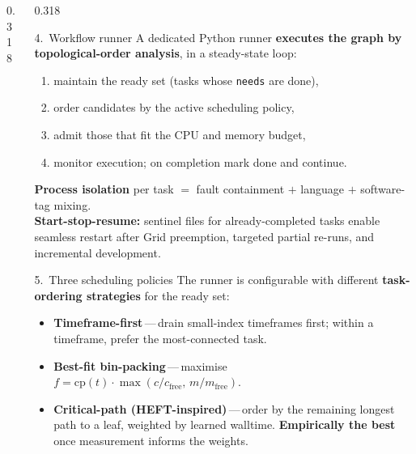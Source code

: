 \documentclass[final,t]{beamer}
\begin{document}
\begin{frame}[t,fragile]
\begin{columns}[t,onlytextwidth]
\begin{column}{0.318\textwidth}
\end{column}

\begin{column}{0.318\textwidth}

\begin{infoblock}{4.~Workflow runner}
A dedicated Python runner \textbf{executes the graph by
topological-order analysis}, in a steady-state loop:
\begin{enumerate}\setlength\itemsep{1mm}
  \item maintain the ready set (tasks whose \texttt{needs} are done),
  \item order candidates by the active scheduling policy,
  \item admit those that fit the CPU and memory budget,
  \item monitor execution; on completion mark done and continue.
\end{enumerate}
\vspace{2mm}
\textbf{Process isolation} per task $=$ fault containment $+$ language
$+$ software-tag mixing.\\[1mm]
\textbf{Start-stop-resume:} sentinel files for already-completed tasks
enable seamless restart after Grid preemption, targeted partial
re-runs, and incremental development.
\end{infoblock}

\vspace{8mm}

\begin{infoblock}{5.~Three scheduling policies}
The runner is configurable with different \textbf{task-ordering
strategies} for the ready set:
\begin{itemize}\setlength\itemsep{2mm}
  \item \textbf{Timeframe-first}\,---\,drain small-index timeframes
        first; within a timeframe, prefer the most-connected task.
  \item \textbf{Best-fit bin-packing}\,---\,maximise
        $f = \mathrm{cp}(t)\cdot\max(c/c_{\text{free}},\,m/m_{\text{free}})$.
  \item \textbf{Critical-path (HEFT-inspired)}\,---\,order by the
        remaining longest path to a leaf, weighted by learned walltime.
        \textbf{Empirically the best} once measurement informs the
        weights.
\end{itemize}
\end{infoblock}

\vspace{8mm}


\end{column}
\end{columns}
\end{frame}
\end{document}
